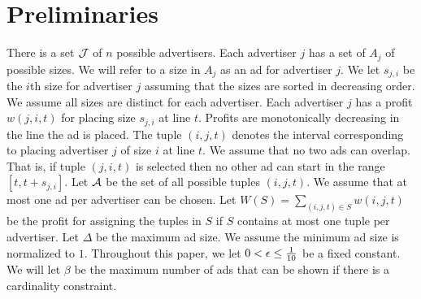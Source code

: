
\section{Preliminaries}
\label{sec:prelim}


 There is a set ${\cal J}$ of $n$ possible advertisers.  Each advertiser $j$ has a set of $A_j$ of possible sizes.  We will refer to a size in $A_j$ as an ad for advertiser $j$.  We let $s_{j,i}$ be the $i$th size for advertiser $j$ assuming that the sizes are sorted in decreasing order.  We assume all sizes are distinct for each advertiser.  Each advertiser $j$ has a profit $w(j,i,t)$ for placing size $s_{j,i}$ at line $t$.  Profits are monotonically decreasing in the line the ad is placed.  The tuple $(i,j,t)$ denotes the interval corresponding to placing advertiser $j$ of size $i$ at line $t$. We assume that no two ads can overlap.  That is, if tuple $(j,i,t)$ is selected then no other ad can start in the range $[t,t+s_{j,i}]$.   Let ${\cal A}$ be the set of all possible tuples $(i,j,t)$.   We assume that at most one ad per advertiser can be chosen.  Let $W(S) = \sum_{(i,j,t) \in S} w(i,j,t)$ be the profit for assigning the tuples in $S$ if $S$ contains at most one tuple per advertiser.    Let $\Delta$ be the maximum ad size.  We assume the minimum ad size is normalized to $1$. Throughout this paper, we let $0 <\epsilon \leq \frac{1}{10}$ be a fixed constant.   We will let $\beta$ be the maximum number of ads that can be shown if there is a cardinality constraint.

